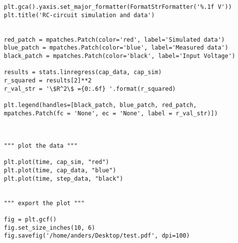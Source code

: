 \begin{lstlisting}[breaklines]
plt.gca().yaxis.set_major_formatter(FormatStrFormatter('%.1f V'))
plt.title('RC-circuit simulation and data')                         


red_patch = mpatches.Patch(color='red', label='Simulated data')     
blue_patch = mpatches.Patch(color='blue', label='Measured data')
black_patch = mpatches.Patch(color='black', label='Input Voltage')

results = stats.linregress(cap_data, cap_sim)    
r_squared = results[2]**2                   
r_val_str = '\$R^2\$ ={0:.6f} '.format(r_squared)                     

plt.legend(handles=[black_patch, blue_patch, red_patch, mpatches.Patch(fc = 'None', ec = 'None', label = r_val_str)])



""" plot the data """

plt.plot(time, cap_sim, "red")
plt.plot(time, cap_data, "blue")
plt.plot(time, step_data, "black")


""" export the plot """

fig = plt.gcf()
fig.set_size_inches(10, 6)
fig.savefig('/home/anders/Desktop/test.pdf', dpi=100)
\end{lstlisting}